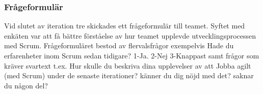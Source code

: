 \subsubsection {Frågeformulär}
Vid slutet av iteration tre skickades ett frågeformulär till teamet. Syftet med enkäten var att få bättre förståelse av hur teamet upplevde utvecklingsprocessen med Scrum. Frågeformuläret bestod av flervalsfrågor exempelvis Hade du erfarenheter inom Scrum sedan tidigare? 1-Ja. 2-Nej 3-Knappast samt frågor som kräver svartext t.ex. Hur skulle du beskriva dina upplevelser av att Jobba agilt (med Scrum) under de senaste iterationer? känner du dig nöjd med det? saknar du någon del?
